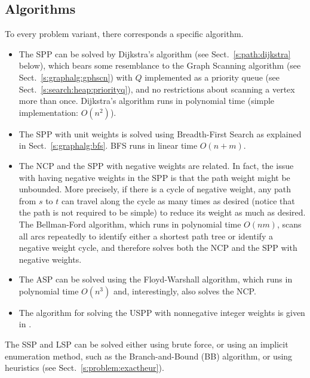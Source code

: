 \documentclass[a4paper]{book}
\theoremstyle{changebreak}                %
\begin{document}
\subsection{Algorithms}
To every problem variant, there corresponds a specific algorithm. 
\begin{itemize}
\item The SPP can be solved by Dijkstra's  algorithm (see
  Sect.~\ref{s:path:dijkstra} below), which bears some resemblance to
  the {\sc Graph Scanning}
  algorithm (see Sect.~\ref{s:graphalg:gphscn}) with $Q$ implemented
  as a priority queue (see Sect.~\ref{s:search:heap:priorityq}), and
  no restrictions about scanning a vertex more than
  once. Dijkstra's algorithm runs in polynomial
  time (simple implementation: $O(n^2)$).
\item The SPP with unit weights is solved using {\sc Breadth-First
  Search} as explained in
  Sect.~\ref{s:graphalg:bfs}. BFS runs in linear time $O(n+m)$.
\item The NCP and the SPP with negative
  weights are
  related. In fact, the issue with having negative weights in the SPP
  is that the path weight might be unbounded. More precisely, if there is a cycle of negative
  weight, any path from $s$ to $t$ can travel
  along the cycle as many times as desired (notice that the path is
  not required to be simple) to reduce its weight
  as much as desired. The Bellman-Ford
  algorithm, which runs in polynomial time $O(nm)$, scans
  all arcs repeatedly to identify either a shortest path
  tree or identify a negative weight cycle,
  and therefore solves both the NCP and the SPP with negative weights.
\item The ASP can be solved using the Floyd-Warshall
  algorithm,
  which runs in polynomial time $O(n^3)$ and, interestingly, also
  solves the NCP.
\item The algorithm for solving the USPP with nonnegative integer
  weights is given in \cite{thorup}. 
\end{itemize}

The SSP and LSP can be solved either using brute
force, or using an implicit enumeration method, such as the {\sc
  Branch-and-Bound}
(BB) algorithm, or using heuristics (see
Sect.~\ref{s:problem:exactheur}).
\end{document}

